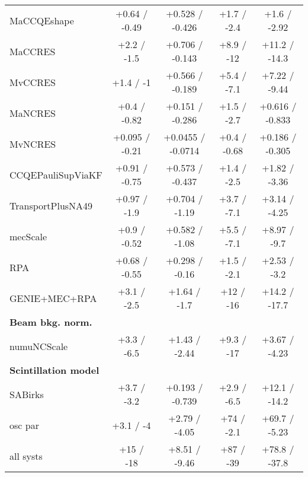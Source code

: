 \begin{table*}[t]
\begin{tabular}{l c c c c}
    MaCCQEshape & +0.64 / -0.49 & +0.528 / -0.426 & +1.7 / -2.4 & +1.6 / -2.92\\
    MaCCRES & +2.2 / -1.5  & +0.706 / -0.143& +8.9 / -12 & +11.2 / -14.3\\
    MvCCRES & +1.4 / -1  & +0.566 / -0.189 & +5.4 / -7.1 & +7.22 / -9.44\\
    MaNCRES & +0.4 / -0.82 & +0.151 / -0.286 & +1.5 / -2.7 & +0.616 / -0.833\\
    MvNCRES & +0.095 / -0.21 & +0.0455 / -0.0714  & +0.4 / -0.68 & +0.186 / -0.305\\
    CCQEPauliSupViaKF & +0.91 / -0.75  & +0.573 / -0.437& +1.4 / -2.5 & +1.82 / -3.36\\
    TransportPlusNA49 & +0.97 / -1.9  & +0.704 / -1.19 & +3.7 / -7.1 & +3.14 / -4.25\\
    mecScale & +0.9 / -0.52  & +0.582 / -1.08 & +5.5 / -7.1 & +8.97 / -9.7\\
    RPA & +0.68 / -0.55  & +0.298 / -0.16 & +1.5 / -2.1 & +2.53 / -3.2\\
    \hline
    GENIE+MEC+RPA & +3.1 / -2.5  & +1.64 / -1.7 & +12 / -16 & +14.2 / -17.7\\
    \textbf{Beam bkg. norm.} & & \\
    numuNCScale & +3.3 / -6.5  & +1.43 / -2.44 & +9.3 / -17 & +3.67 / -4.23\\
    \textbf{Scintillation model} & & \\
    SABirks & +3.7 / -3.2 & +0.193 / -0.739 & +2.9 / -6.5 & +12.1 / -14.2\\
    \hline 
    osc par & +3.1 / -4  & +2.79 / -4.05& +74 / -2.1 & +69.7 / -5.23\\
    \hline
    all systs & +15 / -18  & +8.51 / -9.46 & +87 / -39 & +78.8 / -37.8\\
    \hline
  \end{tabular}
  \label{tab:systShifts}
\end{table*}






